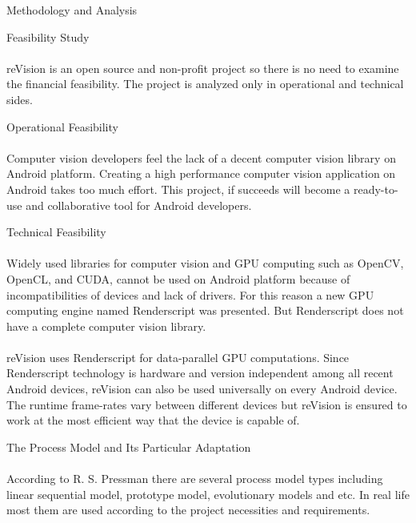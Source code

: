 \documentclass[12pt, a4paper]{article} \pagenumbering{gobble}
\begin{document}
\begin{section}{Methodology and Analysis}
  \begin{subsection}{Feasibility Study}
    \paragraph{}{reVision is an open source and non-profit project so there is no need to examine the financial feasibility. The project is analyzed only in operational and technical sides.}
    \begin{subsubsection}{Operational Feasibility}
      \paragraph{}{Computer vision developers feel the lack of a decent computer vision library on Android platform. Creating a high performance computer vision application on Android takes too much effort. This project, if succeeds will become a ready-to-use and collaborative tool for Android developers.}
    \end{subsubsection}

    \begin{subsubsection}{Technical Feasibility}
      \paragraph{}{Widely used libraries for computer vision and GPU computing such as OpenCV, OpenCL, and CUDA, cannot be used on Android platform because of incompatibilities of devices and lack of drivers. For this reason a new GPU computing engine named Renderscript was presented. But Renderscript does not have a complete computer vision library.}
      \paragraph{}{reVision uses Renderscript for data-parallel GPU computations. Since Renderscript technology is hardware and version independent among all recent Android devices, reVision can also be used universally on every Android device. The runtime frame-rates vary between different devices but reVision is ensured to work at the most efficient way that the device is capable of.}
    \end{subsubsection}
  \end{subsection}
  \newpage
  \begin{subsection}{The Process Model and Its Particular Adaptation}
    \paragraph{}{According to R. S. Pressman \cite{pressman} there are several process model types including linear sequential model, prototype model, evolutionary models and etc. In real life most them are used according to the project necessities and requirements.}

\end{subsection}
\end{section}
\end{document}

